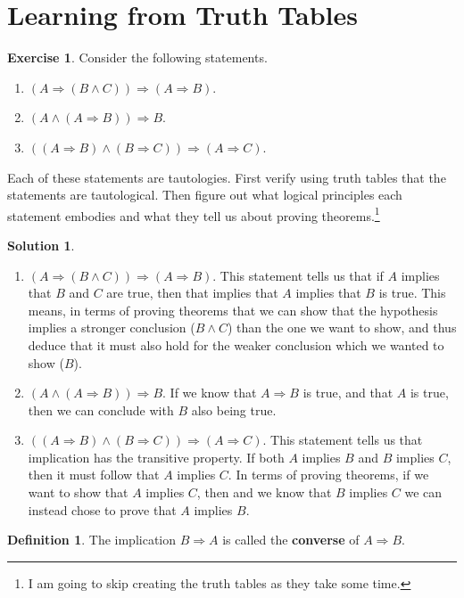 \documentclass[a4paper, 11pt]{report}
\theoremstyle{plain}
\theoremstyle{definition}
\newtheorem{defn}[thm]{Definition}
\newtheorem{exrc}[thm]{Exercise}
\newtheorem*{sltn}{Solution}
\newcommand{\impl}{\Longrightarrow}
\begin{document}
\section{Learning from Truth Tables}
\label{sec:learning_from_truth_tables}

\begin{exrc}
  Consider the following statements.
  \begin{enumerate}
    \item $(A \impl (B \land C)) \impl (A \impl B)$.
    \item $(A \land (A \impl B)) \impl B$.
    \item $((A \impl B) \land (B \impl C)) \impl (A \impl C)$.
  \end{enumerate}
  Each of these statements are tautologies. First verify using truth tables
  that the statements are tautological. Then figure out what logical principles
  each statement embodies and what they tell us about proving theorems.\footnote{I am going to skip creating the truth tables as they take some time.}
\end{exrc}
\begin{sltn}
\begin{enumerate}
    \item $(A \impl (B \land C)) \impl (A \impl B)$.
      This statement tells us that if $A$ implies that $B$ and $C$ are true,
      then that implies that $A$ implies that $B$ is true. This means, in terms
      of proving theorems that we can show that the hypothesis implies a
      stronger conclusion ($B \land C$) than the one we want to show, and thus
      deduce that it must also hold for the weaker conclusion which we wanted
      to show ($B$).
    \item $(A \land (A \impl B)) \impl B$.
      If we know that $A \impl B$ is true, and that $A$ is true, then we can
      conclude with $B$ also being true.
    \item $((A \impl B) \land (B \impl C)) \impl (A \impl C)$.
      This statement tells us that implication has the transitive property. If
      both $A$ implies $B$ and $B$ implies $C$, then it must follow that $A$
      implies $C$. In terms of proving theorems, if we want to show that $A$
      implies $C$, then and we know that $B$ implies $C$ we can instead chose
      to prove that $A$ implies $B$. 
\end{enumerate}
\end{sltn} 
\begin{defn}
  The implication $B \impl A$ is called the \textbf{converse} of $A \impl B$.
\end{defn}
\end{document}
